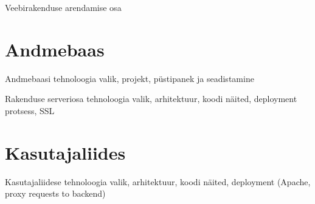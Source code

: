 Veebirakenduse arendamise osa

\section{Andmebaas}
Andmebaasi tehnoloogia valik, projekt, püstipanek ja seadistamine

Rakenduse serveriosa tehnoloogia valik, arhitektuur, koodi näited, deployment protsess, SSL
\section{Kasutajaliides}
Kasutajaliidese tehnoloogia valik, arhitektuur, koodi näited, deployment (Apache, proxy requests to backend)
